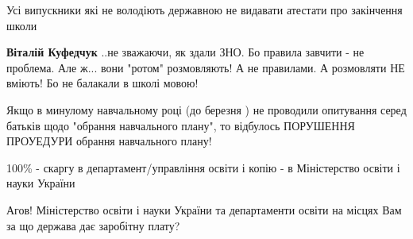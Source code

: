 \begin{itemize}
 
Усі випускники які не володіють державною не видавати атестати про закінчення школи

\begin{itemize}
 
\textbf{Віталій Куфедчук} ..не зважаючи, як здали ЗНО.
Бо правила завчити - не проблема.
Але ж... вони "ротом" розмовляють! А не правилами.
А розмовляти НЕ вміють! Бо не балакали в школі мовою!
\end{itemize}

 

Якщо в минулому навчальному році (до березня ) не проводили опитування серед батьків щодо "обрання навчального плану", то відбулось ПОРУШЕННЯ ПРОУЕДУРИ обрання навчального плану!

100\% - скаргу в департамент/управління освіти і копію - в Міністерство освіти і науки України


 

Агов! Міністерство освіти і науки України та департаменти освіти на місцях Вам за що держава дає заробітну плату?

\end{itemize}

